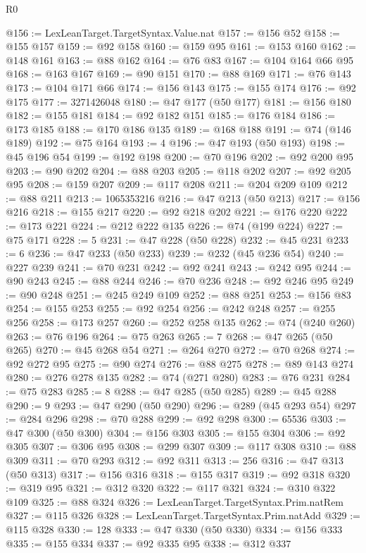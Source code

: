 \begin{lexlean}{R0}
\begin{coremodule}
@156 := LexLeanTarget.TargetSyntax.Value.nat
@157 := @156 @52
@158 := @155 @157
@159 := @92 @158
@160 := @159 @95
@161 := @153 @160
@162 := @148 @161
@163 := @88 @162
@164 := @76 @83
@167 := @104 @164 @66 @95
@168 := @163 @167
@169 := @90 @151
@170 := @88 @169
@171 := @76 @143
@173 := @104 @171 @66
@174 := @156 @143
@175 := @155 @174
@176 := @92 @175
@177 := 3271426048
@180 := @47 @177 (@50 @177)
@181 := @156 @180
@182 := @155 @181
@184 := @92 @182 @151
@185 := @176 @184
@186 := @173 @185
@188 := @170 @186 @135
@189 := @168 @188
@191 := @74 (@146 @189)
@192 := @75 @164
@193 := 4
@196 := @47 @193 (@50 @193)
@198 := @45 @196 @54
@199 := @192 @198
@200 := @70 @196
@202 := @92 @200 @95
@203 := @90 @202
@204 := @88 @203
@205 := @118 @202
@207 := @92 @205 @95
@208 := @159 @207
@209 := @117 @208
@211 := @204 @209 @109
@212 := @88 @211
@213 := 1065353216
@216 := @47 @213 (@50 @213)
@217 := @156 @216
@218 := @155 @217
@220 := @92 @218 @202
@221 := @176 @220
@222 := @173 @221
@224 := @212 @222 @135
@226 := @74 (@199 @224)
@227 := @75 @171
@228 := 5
@231 := @47 @228 (@50 @228)
@232 := @45 @231
@233 := 6
@236 := @47 @233 (@50 @233)
@239 := @232 (@45 @236 @54)
@240 := @227 @239
@241 := @70 @231
@242 := @92 @241
@243 := @242 @95
@244 := @90 @243
@245 := @88 @244
@246 := @70 @236
@248 := @92 @246 @95
@249 := @90 @248
@251 := @245 @249 @109
@252 := @88 @251
@253 := @156 @83
@254 := @155 @253
@255 := @92 @254
@256 := @242 @248
@257 := @255 @256
@258 := @173 @257
@260 := @252 @258 @135
@262 := @74 (@240 @260)
@263 := @76 @196
@264 := @75 @263
@265 := 7
@268 := @47 @265 (@50 @265)
@270 := @45 @268 @54
@271 := @264 @270
@272 := @70 @268
@274 := @92 @272 @95
@275 := @90 @274
@276 := @88 @275
@278 := @89 @143 @274
@280 := @276 @278 @135
@282 := @74 (@271 @280)
@283 := @76 @231
@284 := @75 @283
@285 := 8
@288 := @47 @285 (@50 @285)
@289 := @45 @288
@290 := 9
@293 := @47 @290 (@50 @290)
@296 := @289 (@45 @293 @54)
@297 := @284 @296
@298 := @70 @288
@299 := @92 @298
@300 := 65536
@303 := @47 @300 (@50 @300)
@304 := @156 @303
@305 := @155 @304
@306 := @92 @305
@307 := @306 @95
@308 := @299 @307
@309 := @117 @308
@310 := @88 @309
@311 := @70 @293
@312 := @92 @311
@313 := 256
@316 := @47 @313 (@50 @313)
@317 := @156 @316
@318 := @155 @317
@319 := @92 @318
@320 := @319 @95
@321 := @312 @320
@322 := @117 @321
@324 := @310 @322 @109
@325 := @88 @324
@326 := LexLeanTarget.TargetSyntax.Prim.natRem
@327 := @115 @326
@328 := LexLeanTarget.TargetSyntax.Prim.natAdd
@329 := @115 @328
@330 := 128
@333 := @47 @330 (@50 @330)
@334 := @156 @333
@335 := @155 @334
@337 := @92 @335 @95
@338 := @312 @337

\end{coremodule}
\end{lexlean}
